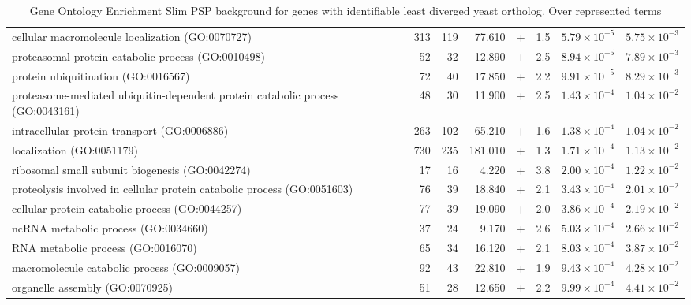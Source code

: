 \begin{sidewaystable}[ht]
\begin{adjustbox}{width=1\textwidth}
\begin{tabular}{lrrrlrrr}
  cellular macromolecule localization (GO:0070727) & 313 & 119 & 77.610 & + & 1.5 & $5.79 \times 10^{-5}$ & $5.75 \times 10^{-3}$ \\ 
  proteasomal protein catabolic process (GO:0010498) & 52 & 32 & 12.890 & + & 2.5 & $8.94 \times 10^{-5}$ & $7.89 \times 10^{-3}$ \\ 
  protein ubiquitination (GO:0016567) & 72 & 40 & 17.850 & + & 2.2 & $9.91 \times 10^{-5}$ & $8.29 \times 10^{-3}$ \\ 
  proteasome-mediated ubiquitin-dependent protein catabolic process (GO:0043161) & 48 & 30 & 11.900 & + & 2.5 & $1.43 \times 10^{-4}$ & $1.04 \times 10^{-2}$ \\ 
  intracellular protein transport (GO:0006886) & 263 & 102 & 65.210 & + & 1.6 & $1.38 \times 10^{-4}$ & $1.04 \times 10^{-2}$ \\ 
  localization (GO:0051179) & 730 & 235 & 181.010 & + & 1.3 & $1.71 \times 10^{-4}$ & $1.13 \times 10^{-2}$ \\ 
  ribosomal small subunit biogenesis (GO:0042274) & 17 & 16 & 4.220 & + & 3.8 & $2.00 \times 10^{-4}$ & $1.22 \times 10^{-2}$ \\ 
  proteolysis involved in cellular protein catabolic process (GO:0051603) & 76 & 39 & 18.840 & + & 2.1 & $3.43 \times 10^{-4}$ & $2.01 \times 10^{-2}$ \\ 
  cellular protein catabolic process (GO:0044257) & 77 & 39 & 19.090 & + & 2.0 & $3.86 \times 10^{-4}$ & $2.19 \times 10^{-2}$ \\ 
  ncRNA metabolic process (GO:0034660) & 37 & 24 & 9.170 & + & 2.6 & $5.03 \times 10^{-4}$ & $2.66 \times 10^{-2}$ \\ 
  RNA metabolic process (GO:0016070) & 65 & 34 & 16.120 & + & 2.1 & $8.03 \times 10^{-4}$ & $3.87 \times 10^{-2}$ \\ 
  macromolecule catabolic process (GO:0009057) & 92 & 43 & 22.810 & + & 1.9 & $9.43 \times 10^{-4}$ & $4.28 \times 10^{-2}$ \\ 
  organelle assembly (GO:0070925) & 51 & 28 & 12.650 & + & 2.2 & $9.99 \times 10^{-4}$ & $4.41 \times 10^{-2}$ \\ 
   \hline
\end{tabular}
\end{adjustbox}
\caption{Gene Ontology Enrichment Slim PSP background for genes with identifiable least diverged yeast ortholog. Over represented terms} 
\label{Table: Gene Ontology Enrichment PSP background for genes with identifiable recent common ortholog. Over represented} 
\end{sidewaystable}

